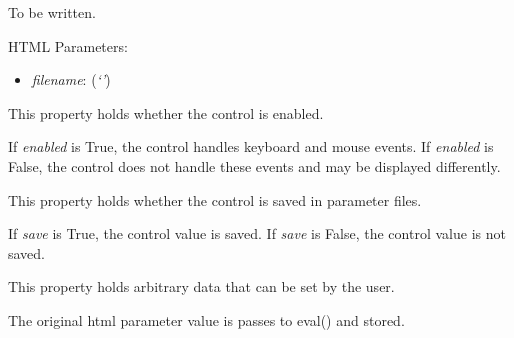 \documentclass[letterpaper,10pt,english]{sphinxmanual}
\begin{document}
\begin{fulllineitems}
\label{api:controls.SubWindow}
To be written.

HTML Parameters:
\begin{itemize}
\item {} 
\emph{filename}: (\emph{`'})

\end{itemize}

\begin{fulllineitems}
\label{api:controls.SubWindow.enabled}
This property holds whether the control is enabled.

If \emph{enabled} is True, the control handles keyboard and mouse events.
If \emph{enabled} is False, the control does not handle these events and may
be displayed differently.

\end{fulllineitems}


\begin{fulllineitems}
\label{api:controls.SubWindow.save}
This property holds whether the control is saved in parameter files.

If \emph{save} is True, the control value is saved.
If \emph{save} is False, the control value is not saved.

\end{fulllineitems}


\begin{fulllineitems}
\label{api:controls.SubWindow.user}
This property holds arbitrary data that can be set by the user.

The original html parameter value is passes to eval() and stored.

\end{fulllineitems}


\end{fulllineitems}

\end{document}
